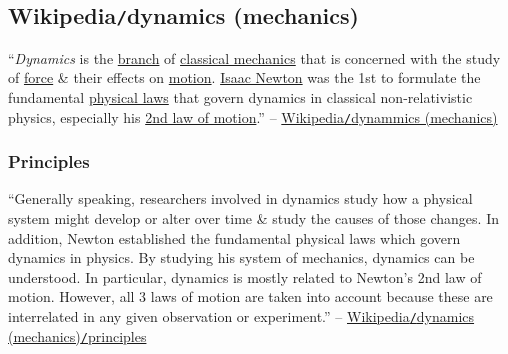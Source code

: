 \documentclass{article}
\begin{document}

\subsection{Wikipedia{\tt/}dynamics (mechanics)}
``\textit{Dynamics} is the \href{https://en.wikipedia.org/wiki/Branch_(academia)#Physics}{branch} of \href{https://en.wikipedia.org/wiki/Classical_mechanics}{classical mechanics} that is concerned with the study of \href{https://en.wikipedia.org/wiki/Force_(physics)}{force} \& their effects on \href{https://en.wikipedia.org/wiki/Motion_(physics)}{motion}. \href{https://en.wikipedia.org/wiki/Isaac_Newton}{Isaac Newton} was the 1st to formulate the fundamental \href{https://en.wikipedia.org/wiki/Physical_law}{physical laws} that govern dynamics in classical non-relativistic physics, especially his \href{https://en.wikipedia.org/wiki/Second_law_of_motion}{2nd law of motion}.'' -- \href{https://en.wikipedia.org/wiki/Dynamics_(mechanics)}{Wikipedia{\tt/}dynammics (mechanics)}

\subsubsection{Principles}
``Generally speaking, researchers involved in dynamics study how a physical system might develop or alter over time \& study the causes of those changes. In addition, Newton established the fundamental physical laws which govern dynamics in physics. By studying his system of mechanics, dynamics can be understood. In particular, dynamics is mostly related to Newton's 2nd law of motion. However, all 3 laws of motion are taken into account because these are interrelated in any given observation or experiment.'' -- \href{https://en.wikipedia.org/wiki/Dynamics_(mechanics)#Principles}{Wikipedia{\tt/}dynamics (mechanics){\tt/}principles}
\end{document}
